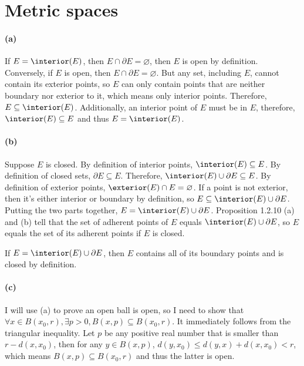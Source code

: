 \section{Metric spaces}

\paragraph{(a)}
If $E = \interior(E)$, then $E \cap \partial E = \varnothing$, then $E$ is open by definition. Conversely, if $E$ is open, then $E \cap \partial E = \varnothing$. But any set, including $E$, cannot contain its exterior points, so $E$ can only contain points that are neither boundary nor exterior to it, which means only interior points. Therefore, $E \subseteq \interior(E)$. Additionally, an interior point of $E$ must be in $E$, therefore, $\interior(E) \subseteq E$ and thus $E = \interior(E)$.

\paragraph{(b)}
Suppose $E$ is closed. By definition of interior points, $\interior(E) \subseteq E$. By definition of closed sets, $\partial E \subseteq E$. Therefore, $\interior(E) \cup \partial E \subseteq E$.
By definition of exterior points, $\exterior(E) \cap E = \varnothing$. If a point is not exterior, then it's either interior or boundary by definition, so $E \subseteq \interior(E) \cup \partial E$. Putting the two parts together, $E = \interior(E) \cup \partial E$. Proposition 1.2.10 (a) and (b) tell that the set of adherent points of $E$ equals $\interior(E) \cup \partial E$, so $E$ equals the set of its adherent points if $E$ is closed.

If $E = \interior(E) \cup \partial E$, then $E$ contains all of its boundary points and is closed by definition.

\paragraph{(c)}
I will use (a) to prove an open ball is open, so I need to show that $\forall x \in B(x_0, r), \exists p > 0, B(x,p) \subseteq B(x_0, r)$. It immediately follows from the triangular inequality. Let $p$ be any positive real number that is smaller than $r - d(x,x_0)$, then for any $y \in B(x,p)$, $d(y,x_0) \le d(y,x) + d(x,x_0) < r$, which means $B(x,p) \subseteq B(x_0, r)$ and thus the latter is open.

